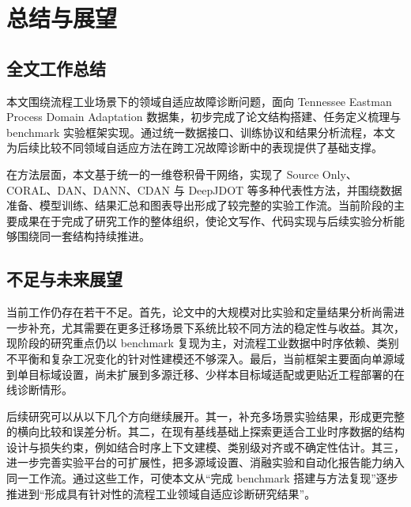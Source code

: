\chapter{总结与展望}

\section{全文工作总结}
本文围绕流程工业场景下的领域自适应故障诊断问题，面向 Tennessee Eastman Process Domain Adaptation 数据集，初步完成了论文结构搭建、任务定义梳理与 benchmark 实验框架实现。通过统一数据接口、训练协议和结果分析流程，本文为后续比较不同领域自适应方法在跨工况故障诊断中的表现提供了基础支撑。

在方法层面，本文基于统一的一维卷积骨干网络，实现了 Source Only、CORAL、DAN、DANN、CDAN 与 DeepJDOT 等多种代表性方法，并围绕数据准备、模型训练、结果汇总和图表导出形成了较完整的实验工作流。当前阶段的主要成果在于完成了研究工作的整体组织，使论文写作、代码实现与后续实验分析能够围绕同一套结构持续推进。

\section{不足与未来展望}
当前工作仍存在若干不足。首先，论文中的大规模对比实验和定量结果分析尚需进一步补充，尤其需要在更多迁移场景下系统比较不同方法的稳定性与收益。其次，现阶段的研究重点仍以 benchmark 复现为主，对流程工业数据中时序依赖、类别不平衡和复杂工况变化的针对性建模还不够深入。最后，当前框架主要面向单源域到单目标域设置，尚未扩展到多源迁移、少样本目标域适配或更贴近工程部署的在线诊断情形。

后续研究可以从以下几个方向继续展开。其一，补充多场景实验结果，形成更完整的横向比较和误差分析。其二，在现有基线基础上探索更适合工业时序数据的结构设计与损失约束，例如结合时序上下文建模、类别级对齐或不确定性估计。其三，进一步完善实验平台的可扩展性，把多源域设置、消融实验和自动化报告能力纳入同一工作流。通过这些工作，可使本文从“完成 benchmark 搭建与方法复现”逐步推进到“形成具有针对性的流程工业领域自适应诊断研究结果”。
